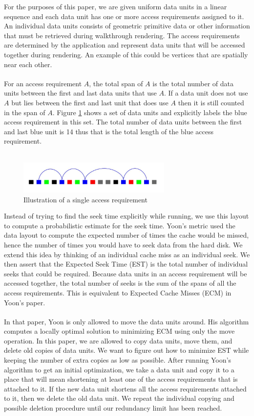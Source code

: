 \documentclass[conference]{acmsiggraph}
\begin{document}
For the purposes of this paper, we are given uniform data units in a linear sequence and each data unit has one or more access requirements assigned to it. An individual data units consists of geometric primitive data or other information that must be retrieved during walkthrough rendering. The access requirements are determined by the application and represent data units that will be accessed together during rendering. An example of this could be vertices that are spatially near each other. \\
\\
For an access requirement $A$, the total span of $A$ is the total number of data units between the first and last data units that use $A$. If a data unit does not use $A$ but lies between the first and last unit that does use $A$ then it is still counted in the span of $A$. Figure \ref{singleAR} shows a set of data units and explicitly labels the blue access requirement in this set. The total number of data units between the first and last blue unit is 14 thus that is the total length of the blue access requirement.\\
\\
\begin{figure}[ht]
\centering
\includegraphics[width=3in]{SingleAR_start.jpg}
\caption{Illustration of a single access requirement}
\label{singleAR}
\end{figure}
Instead of trying to find the seek time explicitly while running, we use this layout to compute a probabilistic estimate for the seek time. Yoon's metric used the data layout to compute the expected number of times the cache would be missed, hence the number of times you would have to seek data from the hard disk. We extend this idea by thinking of an individual cache miss as an individual seek. We then assert that the Expected Seek Time (EST) is the total number of individual seeks that could be required. Because data units in an access requirement will be accessed together, the total number of seeks is the sum of the spans of all the access requirements. This is equivalent to Expected Cache Misses (ECM) in Yoon's paper. \\
\\
In that paper, Yoon is only allowed to move the data units around. His algorithm computes a locally optimal solution to minimizing ECM using only the move operation. In this paper, we are allowed to copy data units, move them, and delete old copies of data units. We want to figure out how to minimize EST while keeping the number of extra copies as low as possible. After running Yoon's algorithm to get an initial optimization, we take a data unit and copy it to a place that will mean shortening at least one of the access requirements that is attached to it. If the new data unit shortens all the access requirements attached to it, then we delete the old data unit. We repeat the individual copying and possible deletion procedure until our redundancy limit has been reached. \\
\end{document}
